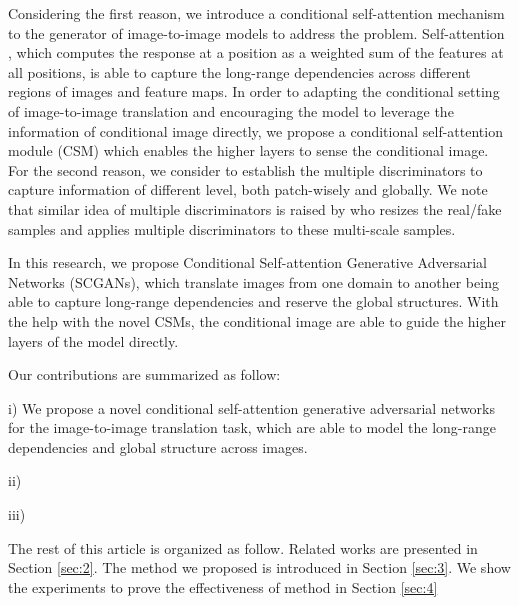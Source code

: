 Considering the first reason, we introduce a conditional self-attention mechanism to the generator of image-to-image models to address the problem.
Self-attention \cite{Non-local, Attention, MachineReading, SAGAN}, which computes the response at a position as a weighted sum of the features at all positions, is able to capture the long-range dependencies across different regions of images and feature maps. In order to adapting the conditional setting of image-to-image translation and encouraging the model to leverage the information of conditional image directly, we propose a conditional self-attention module (CSM) which enables the higher layers to sense the conditional image. 
%
For the second reason, we consider to establish the multiple discriminators to capture information of different level, both patch-wisely and globally. We note that similar idea of multiple discriminators is raised by \cite{Multi-D} who resizes the real/fake samples and applies multiple discriminators to these multi-scale samples. 

In this research, we propose Conditional Self-attention Generative Adversarial Networks (SCGANs), which translate images from one domain to another being able to capture long-range dependencies and reserve the global structures. With the help with the novel CSMs, the conditional image are able to guide the higher layers of the model directly.  

Our contributions are summarized as follow:

i) We propose a novel conditional self-attention generative adversarial networks for the image-to-image translation task, which are able to model the long-range dependencies and global structure across images.

ii)

iii)

The rest of this article is organized as follow. Related works are presented in Section \ref{sec:2}. The method we proposed is introduced in Section \ref{sec:3}. We show the experiments to prove the effectiveness of method in Section \ref{sec:4}